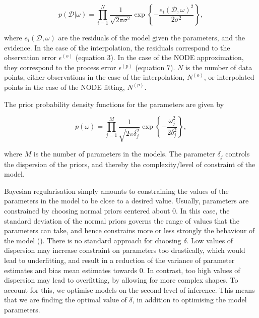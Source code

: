 \documentclass[11pt, oneside]{article}
\begin{document}
\vspace{-0.5cm}
\begin{equation}
	p( \mathcal{D} | \omega) = \prod_{i=1}^{N} \frac{1}{\sqrt{2\pi\sigma^2}}  \exp \left\{ -\frac{e_i(\mathcal{D},\omega)^2}{2\sigma^2}  \right\},
\end{equation}

where $e_i(\mathcal{D},\omega)$ are the residuals of the model given the parameters, and the evidence. 
In the case of the interpolation, the residuals correspond to the observation error $\epsilon^{(o)}$ (equation 3).
In the case of the NODE approximation, they correspond to the process error $\epsilon^{(p)}$ (equation 7).
$N$ is the number of data points, either observations in the case of the interpolation, $N^{(o)}$, or interpolated points in the case of the NODE fitting, $N^{(p)}$.

The prior probability density functions for the parameters are given by

\vspace{-0.5cm}
\begin{equation}
	p(\omega) = \prod_{j=1}^{M} \frac{1}{\sqrt{2\pi\delta_j^2}}  \exp \left\{ -\frac{\omega_j^2}{2\delta_j^2}  \right\},
\end{equation}

where $M$ is the number of parameters in the models.
The parameter $\delta_j$ controls the dispersion of the priors, and thereby the complexity/level of constraint of the model.

Bayesian regularisation simply amounts to constraining the values of the parameters in the model to be close to a desired value. 
Usually, parameters are constrained by choosing normal priors centered about 0.
In this case, the standard deviation of the normal priors governs the range of values that the parameters can take, and hence constrains more or less strongly the behaviour of the model (\cite{Cawley2007}).
There is no standard approach for choosing $\delta$.
Low values of dispersion may increase constraint on parameters too drastically, which would lead to underfitting, and result in a reduction of the variance of parameter estimates and bias mean estimates towards 0.
In contrast, too high values of dispersion may lead to overfitting, by allowing for more complex shapes.
To account for this, we optimise models on the second-level of inference.
This means that we are finding the optimal value of $\delta$, in addition to optimising the model parameters. 
\end{document}
